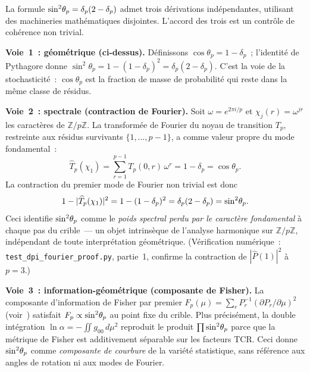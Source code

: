 \documentclass[12pt,a4paper]{article}
\begin{document}
\begin{remarque}
\label{rem:holonomy_routes}
La formule $\sin^2\!\theta_{p} = \delta_p(2 - \delta_p)$ admet trois
dérivations indépendantes, utilisant des machineries mathématiques
disjointes. L'accord des trois est un contrôle de cohérence non
trivial.

\textbf{Voie~1~: géométrique (ci-dessus).}
Définissons $\cos\theta_p = 1 - \delta_p$~; l'identité de Pythagore
donne $\sin^2\!\theta_p = 1 - (1-\delta_p)^2 = \delta_p(2-\delta_p)$.
C'est la voie de la stochasticité~: $\cos\theta_p$ est la fraction de
masse de probabilité qui reste dans la même classe de résidus.

\textbf{Voie~2~: spectrale (contraction de Fourier).}
Soit $\omega = e^{2\pi i/p}$ et $\chi_j(r) = \omega^{jr}$ les
caractères de $\mathbb{Z}/p\mathbb{Z}$. La transformée de Fourier du
noyau de transition $T_p$, restreinte aux résidus survivants
$\{1, \ldots, p-1\}$, a comme valeur propre du mode fondamental~:
\begin{equation}
  \widehat{T}_p(\chi_1) = \sum_{r=1}^{p-1} T_p(0,r)\,\omega^r
  = 1 - \delta_p = \cos\theta_p.
  \label{eq:fourier_eigenvalue}
\end{equation}
La contraction du premier mode de Fourier non trivial est donc
\begin{equation}
  1 - |\widehat{T}_p(\chi_1)|^2 = 1 - (1-\delta_p)^2
  = \delta_p(2-\delta_p) = \sin^2\!\theta_{p}.
  \label{eq:fourier_holonomy}
\end{equation}
Ceci identifie $\sin^2\!\theta_{p}$ comme le \emph{poids spectral perdu par le
caractère fondamental} à chaque pas du crible~--- un objet
intrinsèque de l'analyse harmonique sur $\mathbb{Z}/p\mathbb{Z}$,
indépendant de toute interprétation géométrique. (Vérification
numérique~: \texttt{test\_dpi\_fourier\_proof.py}, partie~1, confirme
la contraction de $|\hat{P}(1)|^2$ à $p = 3$.)

\textbf{Voie~3~: information-géométrique (composante de Fisher).}
La composante d'information de Fisher par premier
$F_p(\mu) = \sum_r P_r^{-1}(\partial P_r/\partial\mu)^2$
(voir~\cite{companion_M5}) satisfait $F_p \propto \sin^2\!\theta_{p}$ au point
fixe du crible. Plus précisément, la double intégration
$\ln\alpha = -\iint g_{00}\,d\mu^2$ reproduit le produit
$\prod \sin^2\!\theta_{p}$ parce que la métrique de Fisher est additivement
séparable sur les facteurs TCR. Ceci donne $\sin^2\!\theta_{p}$ comme
\emph{composante de courbure} de la variété statistique, sans
référence aux angles de rotation ni aux modes de Fourier.


\end{remarque}
\end{document}
